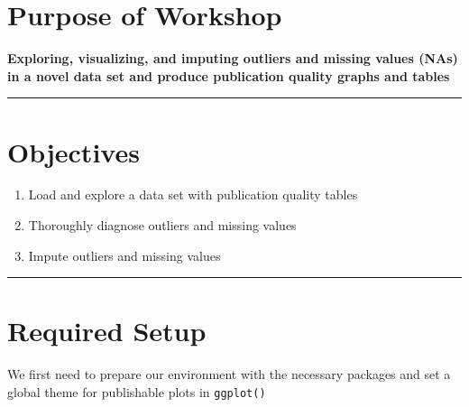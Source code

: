 \documentclass[
  letterpaper,
  DIV=11,
  numbers=noendperiod]{scrreprt}
\providecommand{\tightlist}{%
  \setlength{\itemsep}{0pt}\setlength{\parskip}{0pt}}\usepackage{longtable,booktabs,array}
\begin{document}
\hypertarget{purpose-of-workshop-4}{%
\section{Purpose of Workshop}\label{purpose-of-workshop-4}}

\textbf{Exploring, visualizing, and imputing outliers and missing values
(NAs) in a novel data set and produce publication quality graphs and
tables}

\begin{center}\rule{0.5\linewidth}{0.5pt}\end{center}

\hypertarget{objectives-3}{%
\section{Objectives}\label{objectives-3}}

\begin{enumerate}
\def\labelenumi{\arabic{enumi}.}
\tightlist
\item
  Load and explore a data set with publication quality tables
\item
  Thoroughly diagnose outliers and missing values
\item
  Impute outliers and missing values
\end{enumerate}

\begin{center}\rule{0.5\linewidth}{0.5pt}\end{center}

\hypertarget{required-setup-3}{%
\section{Required Setup}\label{required-setup-3}}

We first need to prepare our environment with the necessary packages and
set a global theme for publishable plots in \texttt{ggplot()}
\end{document}

